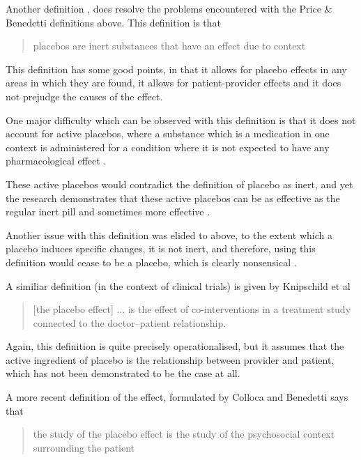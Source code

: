 Another definition \cite{Blasi2001}, does resolve the problems encountered with the Price \& Benedetti  definitions above. This definition is that

\begin{quotation}
  placebos are inert substances that have an effect due to context
\end{quotation}

This definition has some good points, in that it allows for placebo effects in any areas in which they are found, it allows for patient-provider effects and it does not prejudge the causes of the effect. 

One major difficulty which can be observed with this definition is that it does not account for active placebos, where a substance which is a medication in one context is administered for a condition where it is not expected to have any pharmacological effect\cite{Kirsch1998} . 

These active placebos would contradict the definition of placebo as inert, and yet the research demonstrates that these active placebos can be as effective as the regular inert pill \cite{Flaten2004} and sometimes more effective \cite{Kirsch2002a}. 

Another issue with this definition was elided to above, to the extent which a placebo induces specific changes, it is not inert, and therefore, using this definition would cease to be a placebo, which is clearly nonsensical \cite{Moerman2002b}.

A similiar definition (in the context of clinical trials) is given by Knipschild et al \cite{Knipschild2005}

\begin{quotation}
  [the placebo effect] ... is the effect of co-interventions in a
treatment study connected to the doctor--patient relationship.
\end{quotation}

Again, this definition is quite precisely operationalised, but it assumes that the active ingredient of placebo is the relationship between provider and patient, which has not been demonstrated to be the case at all. 


A more recent definition of the effect, formulated by Colloca and Benedetti
 \cite{Colloca2005}  says that 

\begin{quotation}
the study of the placebo effect is the study of the psychosocial context
  surrounding the patient
\end{quotation}


